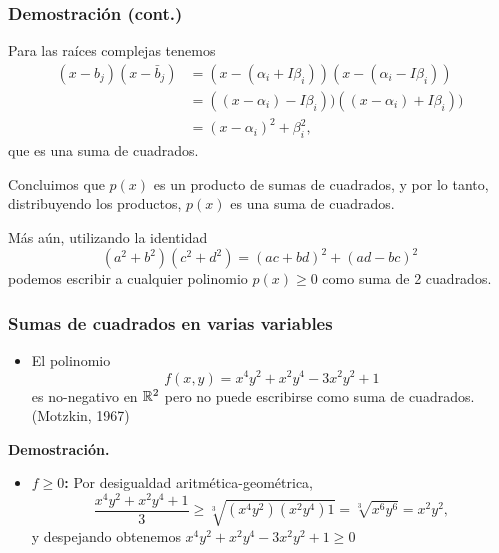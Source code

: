 \documentclass[aspectratio=169,12pt,spanish]{beamer}
\begin{document}

\begin{frame}

\frametitle{Demostración (cont.)}
Para las raíces complejas tenemos
\begin{align*}
(x-b_j)(x - \bar b_j) &= (x - (\alpha_i + I \beta_i  ))(x - (\alpha_i - I  \beta_i )) \\
&= ((x - \alpha_i) - I\beta_i  ))((x - \alpha_i) + I \beta_i  )) \\
&= (x - \alpha_i)^2 + \beta_i^2,
\end{align*}
que es una suma de cuadrados.

Concluimos que $p(x)$ es un producto de sumas de cuadrados, y por lo tanto, distribuyendo los productos, $p(x)$ es una suma de cuadrados.

Más aún, utilizando la identidad
\[
(a^2+b^2)(c^2+d^2) = (ac+bd)^2 + (ad-bc)^2
\]
podemos escribir a cualquier polinomio $p(x) \ge 0$ como suma de 2 cuadrados.

\end{frame}


\begin{frame}

\frametitle{Sumas de cuadrados en varias variables}

\begin{itemize}
\item El polinomio
\[
f(x, y) = x^4y^2 + x^2y^4 - 3x^2y^2+1
 \]
 es no-negativo en $\mathbb{R}^2$ pero no puede escribirse como suma de cuadrados. (Motzkin, 1967)
\end{itemize}

\textbf{Demostración.}

\begin{itemize}
\item \textbf{$f \ge 0$:} Por desigualdad aritmética-geométrica,
$$
\frac{x^4y^2 + x^2y^4 + 1}{3} \ge \sqrt[3]{(x^4y^2)(x^2y^4) 1} = \sqrt[3]{x^6y^6} = x^2y^2,
$$
y despejando obtenemos $x^4y^2 + x^2y^4 - 3x^2y^2+1 \ge 0$
\end{itemize}

\end{frame}

\end{document}
